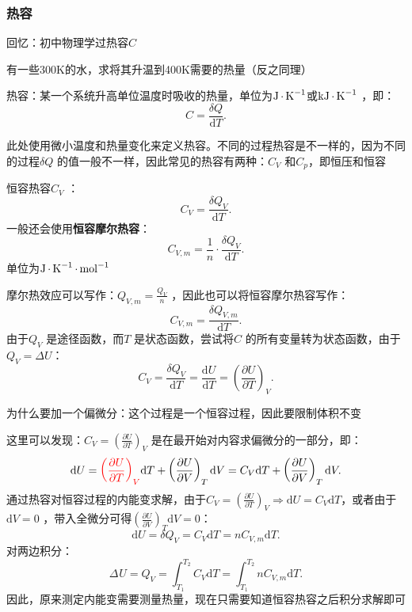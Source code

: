 \subsubsection*{热容}%
\label{subsub*:热容}
回忆：初中物理学过热容$C$ 
\begin{eg}
    有一些300K的水，求将其升温到400K需要的热量（反之同理）
\end{eg}
\begin{defi}
    热容：某一个系统升高单位温度时吸收的热量，单位为$\ce{J*K^{-1}}$或$\ce{kJ*K^{-1}}$ ，即：\[\boxed{
        C = \frac{\delta Q}{\mathrm{d}T}
    .}\]
\end{defi}
此处使用微小温度和热量变化来定义热容。不同的过程热容是不一样的，因为不同的过程$\delta Q$ 的值一般不一样，因此常见的热容有两种：$C_{V}$ 和$C_{p}$，即恒压和恒容
\begin{defi}
    恒容热容$C_{V}$ ：\[
        C_{V} = \frac{\delta Q_{V}}{\mathrm{d}T}
    .\]
    一般还会使用\textbf{恒容摩尔热容}：\[
        C_{V,m} = \frac{1}{n}\cdot \frac{\delta Q_{V}}{\mathrm{d}T}
    .\]
    单位为$\ce{J*K^{-1}*mol^{-1}}$
\end{defi}
摩尔热效应可以写作：$Q_{V,m} = \frac{Q_{V}}{n}$ ，因此也可以将恒容摩尔热容写作：\[
    C_{V,m} = \frac{\delta Q_{V,m}}{\mathrm{d}T}
.\]
由于$Q_{V}$ 是途径函数，而$T$ 是状态函数，尝试将$C$ 的所有变量转为状态函数，由于$Q_{V}=\Delta U$：\[
    C_{V} = \frac{\delta Q_{V}}{\mathrm{d}T} = \frac{\mathrm{d}U}{\mathrm{d}T} = \left(\frac{\partial U}{\partial T}\right)_{V}
.\]
\begin{notation}
    为什么要加一个偏微分：这个过程是一个恒容过程，因此要限制体积不变
\end{notation}
这里可以发现：$C_{V} = \left(\frac{\partial U}{\partial T}\right)_{V}$ 是在最开始对内容求偏微分的一部分，即：\[
    \mathrm{d}U = \textcolor{red}{\left(\frac{\partial U}{\partial T}\right)_{V}}\mathrm{d}T + \left(\frac{\partial U}{\partial V}\right)_{T}\mathrm{d}V = C_{V}\mathrm{d}T + \left(\frac{\partial U}{\partial V}\right)_{T}\mathrm{d}V
.\]
通过热容对恒容过程的内能变求解，由于$C_{V} = \left(\frac{\partial U}{\partial T}\right)_{V}\Rightarrow \mathrm{d}U = C_{V}\mathrm{d}T$，或者由于$\mathrm{d}V=0$ ，带入全微分可得$\left(\frac{\partial U}{\partial V}\right)_{T}\mathrm{d}V = 0$：\[
    \mathrm{d}U = \delta Q_{V} = C_{V}\mathrm{d}T = nC_{V,m}\mathrm{d}T
.\]
对两边积分：\[
    \Delta_\text{}U = Q_{V} = \int_{T_1}^{T_2} C_{V} \mathrm{d}T = \int_{T_1}^{T_2} nC_{V,m} \mathrm{d}T
.\]
因此，原来测定内能变需要测量热量，现在只需要知道恒容热容之后积分求解即可

